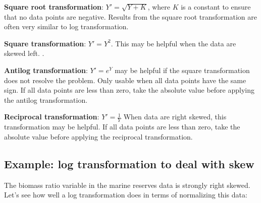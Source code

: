 \documentclass[]{book}
\theoremstyle{definition}
\theoremstyle{definition}
\theoremstyle{definition}
\theoremstyle{remark}
\begin{document}
\textbf{Square root transformation}: \(Y' = \sqrt{Y + K}\), where \(K\)
is a constant to ensure that no data points are negative. Results from
the square root transformation are often very similar to log
transformation.

\textbf{Square transformation}: \(Y' = Y^2\). This may be helpful when
the data are skewed left. .

\textbf{Antilog transformation}: \(Y' = e^Y\) may be helpful if the
square transformation does not resolve the problem. Only usable when all
data points have the same sign. If all data points are less than zero,
take the absolute value before applying the antilog transformation.

\textbf{Reciprocal transformation}: \(Y' = {\frac{1}{Y}}\) When data are
right skewed, this transformation may be helpful. If all data points are
less than zero, take the absolute value before applying the reciprocal
transformation.

\hypertarget{example-log-transformation-to-deal-with-skew}{%
\subsection*{Example: log transformation to deal with
skew}\label{example-log-transformation-to-deal-with-skew}}

The biomass ratio variable in the marine reserves data is strongly right
skewed. Let's see how well a log transformation does in terms of
normalizing this data:
\end{document}

